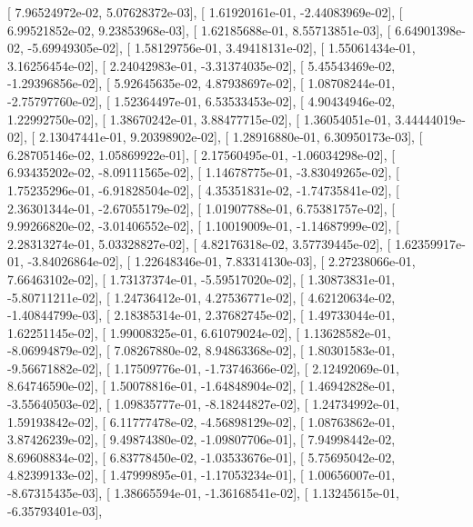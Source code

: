 \documentclass{article}
\begin{document}
       [  7.96524972e-02,   5.07628372e-03],
       [  1.61920161e-01,  -2.44083969e-02],
       [  6.99521852e-02,   9.23853968e-03],
       [  1.62185688e-01,   8.55713851e-03],
       [  6.64901398e-02,  -5.69949305e-02],
       [  1.58129756e-01,   3.49418131e-02],
       [  1.55061434e-01,   3.16256454e-02],
       [  2.24042983e-01,  -3.31374035e-02],
       [  5.45543469e-02,  -1.29396856e-02],
       [  5.92645635e-02,   4.87938697e-02],
       [  1.08708244e-01,  -2.75797760e-02],
       [  1.52364497e-01,   6.53533453e-02],
       [  4.90434946e-02,   1.22992750e-02],
       [  1.38670242e-01,   3.88477715e-02],
       [  1.36054051e-01,   3.44444019e-02],
       [  2.13047441e-01,   9.20398902e-02],
       [  1.28916880e-01,   6.30950173e-03],
       [  6.28705146e-02,   1.05869922e-01],
       [  2.17560495e-01,  -1.06034298e-02],
       [  6.93435202e-02,  -8.09111565e-02],
       [  1.14678775e-01,  -3.83049265e-02],
       [  1.75235296e-01,  -6.91828504e-02],
       [  4.35351831e-02,  -1.74735841e-02],
       [  2.36301344e-01,  -2.67055179e-02],
       [  1.01907788e-01,   6.75381757e-02],
       [  9.99266820e-02,  -3.01406552e-02],
       [  1.10019009e-01,  -1.14687999e-02],
       [  2.28313274e-01,   5.03328827e-02],
       [  4.82176318e-02,   3.57739445e-02],
       [  1.62359917e-01,  -3.84026864e-02],
       [  1.22648346e-01,   7.83314130e-03],
       [  2.27238066e-01,   7.66463102e-02],
       [  1.73137374e-01,  -5.59517020e-02],
       [  1.30873831e-01,  -5.80711211e-02],
       [  1.24736412e-01,   4.27536771e-02],
       [  4.62120634e-02,  -1.40844799e-03],
       [  2.18385314e-01,   2.37682745e-02],
       [  1.49733044e-01,   1.62251145e-02],
       [  1.99008325e-01,   6.61079024e-02],
       [  1.13628582e-01,  -8.06994879e-02],
       [  7.08267880e-02,   8.94863368e-02],
       [  1.80301583e-01,  -9.56671882e-02],
       [  1.17509776e-01,  -1.73746366e-02],
       [  2.12492069e-01,   8.64746590e-02],
       [  1.50078816e-01,  -1.64848904e-02],
       [  1.46942828e-01,  -3.55640503e-02],
       [  1.09835777e-01,  -8.18244827e-02],
       [  1.24734992e-01,   1.59193842e-02],
       [  6.11777478e-02,  -4.56898129e-02],
       [  1.08763862e-01,   3.87426239e-02],
       [  9.49874380e-02,  -1.09807706e-01],
       [  7.94998442e-02,   8.69608834e-02],
       [  6.83778450e-02,  -1.03533676e-01],
       [  5.75695042e-02,   4.82399133e-02],
       [  1.47999895e-01,  -1.17053234e-01],
       [  1.00656007e-01,  -8.67315435e-03],
       [  1.38665594e-01,  -1.36168541e-02],
       [  1.13245615e-01,  -6.35793401e-03],
\end{document}
